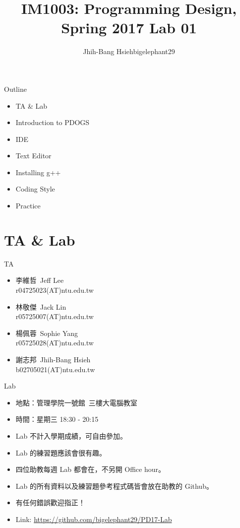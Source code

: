 \documentclass[t]{beamer}
\title{IM1003: Programming Design, Spring 2017  \linebreak Lab 01}
\author[bigelephant29]{Jhih-Bang Hsieh\linebreak \small{bigelephant29}}
\institute{\textbf{National Taiwan University}}
\date{}
\begin{document}
\begin{frame}
  \maketitle
\end{frame}

\begin{frame}{Outline}
  \begin{itemize}
    \item TA \& Lab
    \item Introduction to PDOGS
    \item IDE
    \item Text Editor
    \item Installing g++
    \item Coding Style
    \item Practice
  \end{itemize}
\end{frame}

\section{TA \& Lab}
\begin{frame}{TA}
  \begin{itemize}
    \setlength\itemsep{1em}
    \item
    李維哲\ Jeff Lee\\
    r04725023(AT)ntu.edu.tw
    \item
    林敬傑\ Jack Lin\\
    r05725007(AT)ntu.edu.tw
    \item
    楊佩蓉\ Sophie Yang\\
    r05725028(AT)ntu.edu.tw
    \item
    謝志邦\ Jhih-Bang Hsieh\\
    b02705021(AT)ntu.edu.tw
  \end{itemize}
\end{frame}

\begin{frame}{Lab}
  \begin{itemize}
    \item 地點：管理學院一號館\ 三樓大電腦教室
    \item 時間：星期三 18:30 - 20:15
    \item Lab 不計入學期成績，可自由參加。
    \item Lab 的練習題應該會很有趣。
    \item 四位助教每週 Lab 都會在，不另開 Office hour。
    \item Lab 的所有資料以及練習題參考程式碼皆會放在助教的 Github。
    \item 有任何錯誤歡迎指正！
    \item Link: \href{https://github.com/bigelephant29/PD17-Lab}{https://github.com/bigelephant29/PD17-Lab}
  \end{itemize}
\end{frame}
\end{document}
